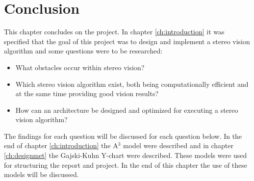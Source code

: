 \chapter{Conclusion}\label{ch:conclusion}
This chapter concludes on the project. In chapter \vref{ch:introduction} it was specified that the goal of this project was to design and implement a stereo vision algorithm and some questions were to be researched:
\begin{itemize}
  \item What obstacles occur within stereo vision?
  \item Which stereo vision algorithm exist, both being computationally efficient and at the same time providing good vision results?
  \item How can an architecture be designed and optimized for executing a stereo vision algorithm?
\end{itemize}
The findings for each question will be discussed for each question below.
In the end of chapter \vref{ch:introduction} the A$^3$ model were described and in chapter \vref{ch:designmet} the Gajski-Kuhn Y-chart were described. These models were used for structuring the report and project. In the end of this chapter the use of these models will be discussed.

